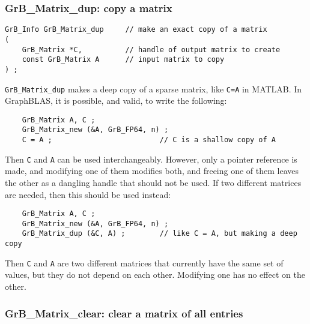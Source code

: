 \documentclass[12pt]{article}
\begin{document}
\subsubsection{{\sf GrB\_Matrix\_dup:}          copy a matrix}
\label{matrix_dup}

\begin{mdframed}[userdefinedwidth=6in]
{\footnotesize
\begin{verbatim}
GrB_Info GrB_Matrix_dup     // make an exact copy of a matrix
(
    GrB_Matrix *C,          // handle of output matrix to create
    const GrB_Matrix A      // input matrix to copy
) ;
\end{verbatim} } \end{mdframed}

\verb'GrB_Matrix_dup' makes a deep copy of a sparse matrix, like \verb'C=A' in
MATLAB.  In GraphBLAS, it is possible, and valid, to write the following:

    {\footnotesize
    \begin{verbatim}
    GrB_Matrix A, C ;
    GrB_Matrix_new (&A, GrB_FP64, n) ;
    C = A ;                         // C is a shallow copy of A  \end{verbatim}}

Then \verb'C' and \verb'A' can be used interchangeably.  However, only a
pointer reference is made, and modifying one of them modifies both, and freeing
one of them leaves the other as a dangling handle that should not be used.  If
two different matrices are needed, then this should be used instead:

    {\footnotesize
    \begin{verbatim}
    GrB_Matrix A, C ;
    GrB_Matrix_new (&A, GrB_FP64, n) ;
    GrB_Matrix_dup (&C, A) ;        // like C = A, but making a deep copy \end{verbatim}}

Then \verb'C' and \verb'A' are two different matrices that currently have the
same set of values, but they do not depend on each other.  Modifying one has
no effect on the other.

\newpage
\subsubsection{{\sf GrB\_Matrix\_clear:}        clear a matrix of all entries}
\label{matrix_clear}
\end{document}
